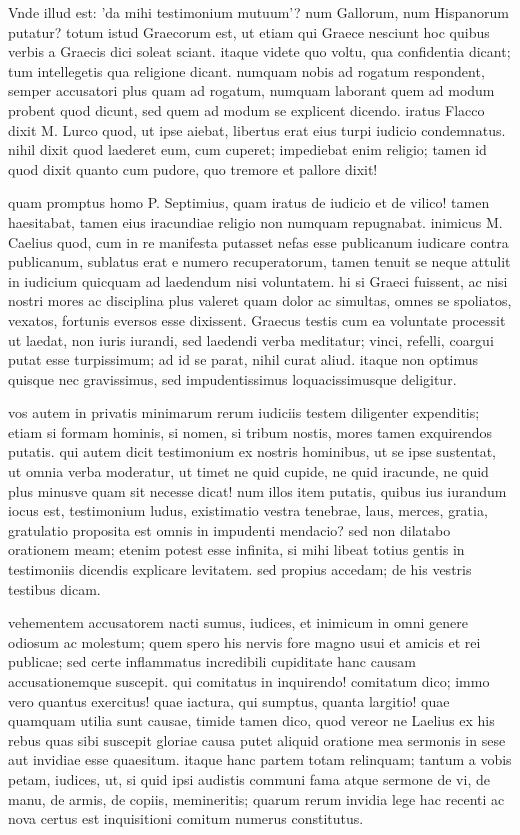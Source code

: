  Vnde illud est: 'da mihi testimonium mutuum'? num Gallorum, num Hispanorum putatur? totum istud Graecorum est, ut etiam qui Graece nesciunt hoc quibus verbis a Graecis dici soleat sciant. itaque videte quo voltu, qua confidentia dicant; tum intellegetis qua religione dicant. numquam nobis ad rogatum respondent, semper accusatori plus quam ad rogatum, numquam laborant quem ad modum probent quod dicunt, sed quem ad modum se explicent dicendo. iratus Flacco dixit M. Lurco quod, ut ipse aiebat, libertus erat eius turpi iudicio condemnatus. nihil dixit quod laederet eum, cum cuperet; impediebat enim religio; tamen id quod dixit quanto cum pudore, quo tremore et pallore dixit!

 quam promptus homo P. Septimius, quam iratus de iudicio et de vilico! tamen haesitabat, tamen eius iracundiae religio non numquam repugnabat. inimicus M. Caelius quod, cum in re manifesta putasset nefas esse publicanum iudicare contra publicanum, sublatus erat e numero recuperatorum, tamen tenuit se neque attulit in iudicium quicquam ad laedendum nisi voluntatem. hi si Graeci fuissent, ac nisi nostri mores ac disciplina plus valeret quam dolor ac simultas, omnes se spoliatos, vexatos, fortunis eversos esse dixissent. Graecus testis cum ea voluntate processit ut laedat, non iuris iurandi, sed laedendi verba meditatur; vinci, refelli, coargui putat esse turpissimum; ad id se parat, nihil curat aliud. itaque non optimus quisque nec gravissimus, sed impudentissimus loquacissimusque deligitur.

 vos autem in privatis minimarum rerum iudiciis testem diligenter expenditis; etiam si formam hominis, si nomen, si tribum nostis, mores tamen exquirendos putatis. qui autem dicit testimonium ex nostris hominibus, ut se ipse sustentat, ut omnia verba moderatur, ut timet ne quid cupide, ne quid iracunde, ne quid plus minusve quam sit necesse dicat! num illos item putatis, quibus ius iurandum iocus est, testimonium ludus, existimatio vestra tenebrae, laus, merces, gratia, gratulatio proposita est omnis in impudenti mendacio? sed non dilatabo orationem meam; etenim potest esse infinita, si mihi libeat totius gentis in testimoniis dicendis explicare levitatem. sed propius accedam; de his vestris testibus dicam.

 vehementem accusatorem nacti sumus, iudices, et inimicum in omni genere odiosum ac molestum; quem spero his nervis fore magno usui et amicis et rei publicae; sed certe inflammatus incredibili cupiditate hanc causam accusationemque suscepit. qui comitatus in inquirendo! comitatum dico; immo vero quantus exercitus! quae iactura, qui sumptus, quanta largitio! quae quamquam utilia sunt causae, timide tamen dico, quod vereor ne Laelius ex his rebus quas sibi suscepit gloriae causa putet aliquid oratione mea sermonis in sese aut invidiae esse quaesitum. itaque hanc partem totam relinquam; tantum a vobis petam, iudices, ut, si quid ipsi audistis communi fama atque sermone de vi, de manu, de armis, de copiis, memineritis; quarum rerum invidia lege hac recenti ac nova certus est inquisitioni comitum numerus constitutus.

